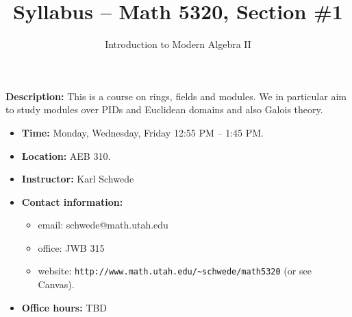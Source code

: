 \documentclass[oneside,10pt]{amsart}
\title{Syllabus -- Math 5320, Section \#1}
\author{Introduction to Modern Algebra II}
\begin{document}
\maketitle

\noindent
{\bf Description: } This is a course on rings, fields and modules.  We in particular aim to study modules over PIDs and Euclidean domains and also Galois theory.
\vskip 12pt

\begin{itemize}
 \item{} {\bf Time:  }  Monday, Wednesday, Friday 12:55 PM -- 1:45 PM.
 \item{} {\bf Location:  }   AEB 310.
 \item{} {\bf Instructor: }  Karl Schwede
\item{}  {\bf Contact information:}
\begin{itemize}
 \item{}  {email: }  schwede@math.utah.edu
 \item{}  {office:  } JWB 315
 \item{}  {website: }  {\tt{http://www.math.utah.edu/{\textasciitilde}schwede/math5320}} \hskip 12pt
 (or see Canvas). 
\end{itemize}
\item{}  {\bf Office hours:}  TBD
\end{itemize}
\end{document}
